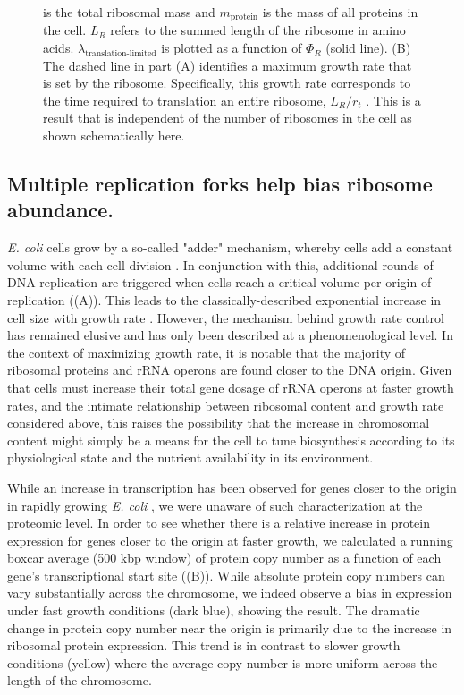 \begin{figure}
\begin{fullwidth}
{{            is the total ribosomal mass and $m_{\textrm{protein}}$ is the mass
            of all proteins in the cell. $L_R$ refers to the summed length of
            the ribosome in amino acids.
            $\lambda_{\textrm{translation-limited}}$ is plotted as a function of
            $\Phi_R$ (solid line). (B) The dashed line in part (A) identifies a
            maximum growth rate that is set by the ribosome. Specifically, this
            growth rate corresponds to the time required to  translation an
            entire ribosome, $L_R/ r_t$ . This is a result that is independent
            of the number of ribosomes in the cell as shown schematically here.
            }
        \label{fig:translation_1}
        }
  \end{fullwidth}
\end{figure}


\subsection{Multiple replication forks help bias ribosome abundance.}

\textit{E. coli} cells grow by a so-called "adder" mechanism, whereby cells add a constant
volume with each cell division \citep{taheriaraghi2015}. In conjunction with
this, additional rounds of DNA replication are triggered when cells reach a
critical volume per origin of replication ((A)). This
leads to the classically-described exponential increase in cell size with growth
rate \cite{schaechter1958, si2017, si2019}. However, the mechanism behind growth rate
control has remained elusive and has only been described at a phenomenological level. In the context of maximizing growth rate,
it is notable that the majority of ribosomal proteins and rRNA operons are found
closer to the DNA origin. Given that cells must increase their total gene dosage
of rRNA operons at faster growth rates, and the intimate relationship between
ribosomal content and growth rate considered above, this raises the possibility
that the increase in chromosomal content might simply be a means for the cell
to tune biosynthesis according to its physiological state and the nutrient
availability in its environment.

While an increase in transcription has been observed for genes closer to the
origin in rapidly growing \textit{E. coli} \citep{scholz2019}, we were
unaware of such characterization at the proteomic level. In order to see
whether there is a relative increase in protein expression for genes closer
to the origin at faster growth, we calculated a running boxcar average (500
kbp window) of protein copy number as a function of each gene's
transcriptional start site ((B)). While absolute
protein copy numbers can vary substantially across the chromosome, we indeed
observe a bias in expression under fast growth conditions (dark blue), showing the
result. The dramatic change in protein copy number near the origin is primarily
due to the increase in ribosomal protein expression. This trend is in
contrast to slower growth conditions (yellow) where the average copy number is more
uniform across the length of the chromosome.

